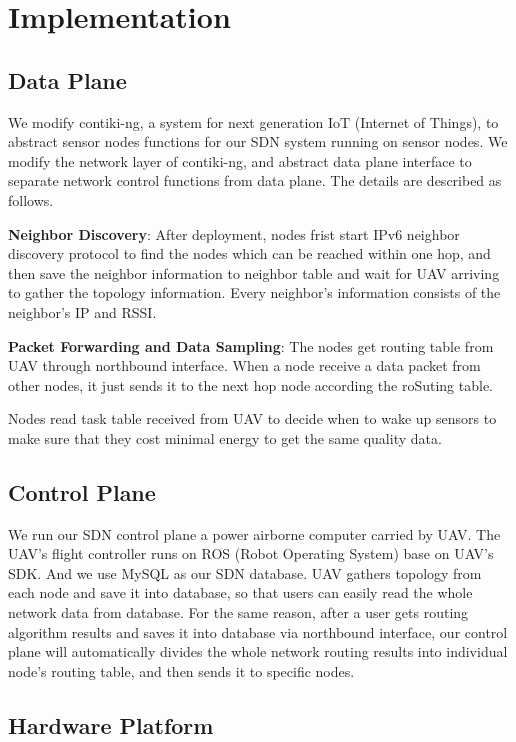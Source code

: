 \section{Implementation}
\label{Imp}



\subsection{Data Plane}

We modify contiki-ng, a system for next generation IoT (Internet of
Things), to abstract sensor nodes functions for our SDN system running on sensor nodes.
We modify the network layer of contiki-ng, and abstract
data plane interface to separate network control functions from data plane. 
The details are described as follows.

\textbf{Neighbor Discovery}: After deployment, nodes frist start IPv6 neighbor
discovery protocol to find the nodes which can be reached within one hop, and
then save the neighbor information to neighbor table and wait for UAV arriving
to gather the topology information. Every neighbor's information consists of the
neighbor's IP and RSSI. 

\textbf{Packet Forwarding and Data Sampling}: The nodes get routing table from UAV through
northbound interface. When a node receive a data packet from other nodes, it
just sends it to the next hop node according the roSuting table.

Nodes read task table received from UAV to decide when
to wake up sensors to make sure that they cost minimal energy to get the same
quality data. 

\subsection{Control Plane}

We run our SDN control plane a power airborne computer carried by UAV. 
The UAV's flight controller runs on ROS (Robot Operating System) base on UAV's SDK.
And we use MySQL as our SDN database. UAV gathers topology from each node and save
it into database, so that users can easily read the whole network data from
database. For the same reason, after a user gets routing algorithm results and
saves it into database via northbound interface, our control plane will
automatically divides the whole network routing results into individual node's
routing table, and then sends it to specific nodes.

\subsection{Hardware Platform}

